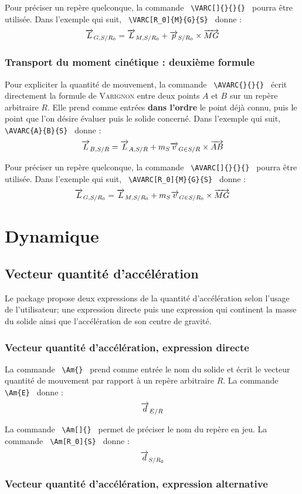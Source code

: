 \documentclass[12pt]{article}
\begin{document}
Pour préciser un repère quelconque, la commande \verb| \VARC[]{}{}{} | pourra être utilisée. Dans l'exemple qui suit, \verb| \VARC[R_0]{M}{G}{S} | donne : $$\VARC[R_0]{M}{G}{S}$$

\subsubsection{Transport du moment cinétique : deuxième formule}
Pour expliciter la quantité de mouvement, la commande \verb| \AVARC{}{}{} | écrit directement la formule de \textsc{Varignon} entre deux points $A$ et $B$ sur un repère arbitraire $R$. Elle prend comme entrées \textbf{dans l'ordre} le point déjà connu, puis le point que l'on désire évaluer puis le solide concerné. Dans l'exemple qui suit, \verb| \AVARC{A}{B}{S} | donne : $$\AVARC{A}{B}{S}$$

Pour préciser un repère quelconque, la commande \verb| \AVARC[]{}{}{} | pourra être utilisée. Dans l'exemple qui suit, \verb| \AVARC[R_0]{M}{G}{S} | donne : $$\AVARC[R_0]{M}{G}{S}$$

\newpage

\section{Dynamique}

\subsection{Vecteur quantité d'accélération}

Le package propose deux expressions de la quantité d'accélération selon l'usage de l'utilisateur; une expression directe puis une expression qui continent la masse du solide ainsi que l'accélération de son centre de gravité.

\subsubsection{Vecteur quantité d'accélération, expression directe}

La commande \verb| \Am{} | prend comme entrée le nom du solide et écrit le vecteur quantité de mouvement par rapport à un repère arbitraire $R$. La commande  \verb| \Am{E} | donne : $$\Am{E}$$

La commande \verb| \Am[]{} | permet de préciser le nom du repère en jeu. La commande  \verb| \Am[R_0]{S} | donne : $$\Am[R_0]{S}$$

\subsubsection{Vecteur quantité d'accélération, expression alternative}
\end{document}
